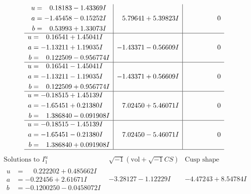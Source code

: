 \documentclass[1p]{elsarticle_modified}
\theoremstyle{definition}
\newcommand{\I}{\sqrt{-1}}
\begin{document}
$$\begin{array}{c|c|c}
\begin{aligned}
u &= \phantom{-}0.18183 - 1.43369 I \\
a &= -1.45458 - 0.15252 I \\
b &= \phantom{-}0.53993 + 1.33073 I\end{aligned}
 & \phantom{-}5.79641 + 5.39823 I & \phantom{-0.000000 } 0 \\ \hline\begin{aligned}
u &= \phantom{-}0.16541 + 1.45041 I \\
a &= -1.13211 + 1.19035 I \\
b &= \phantom{-}0.122509 - 0.956774 I\end{aligned}
 & -1.43371 - 0.56609 I & \phantom{-0.000000 } 0 \\ \hline\begin{aligned}
u &= \phantom{-}0.16541 - 1.45041 I \\
a &= -1.13211 - 1.19035 I \\
b &= \phantom{-}0.122509 + 0.956774 I\end{aligned}
 & -1.43371 + 0.56609 I & \phantom{-0.000000 } 0 \\ \hline\begin{aligned}
u &= -0.18515 + 1.45139 I \\
a &= -1.65451 + 0.21380 I \\
b &= \phantom{-}1.386840 - 0.091908 I\end{aligned}
 & \phantom{-}7.02450 + 5.46071 I & \phantom{-0.000000 } 0 \\ \hline\begin{aligned}
u &= -0.18515 - 1.45139 I \\
a &= -1.65451 - 0.21380 I \\
b &= \phantom{-}1.386840 + 0.091908 I\end{aligned}
 & \phantom{-}7.02450 - 5.46071 I & \phantom{-0.000000 } 0\\
 \hline 
 \end{array}$$\newpage$$\begin{array}{c|c|c}  
\text{Solutions to }I^u_{1}& \I (\text{vol} + \sqrt{-1}CS) & \text{Cusp shape}\\
 \hline 
\begin{aligned}
u &= \phantom{-}0.222202 + 0.485662 I \\
a &= -0.22456 + 2.61671 I \\
b &= -0.1200250 - 0.0458072 I\end{aligned}
 & -3.28127 - 1.12229 I & -4.47243 + 8.54784 I \\ \hline\begin{aligned}

\end{aligned}
\end{array}$$
\end{document}
